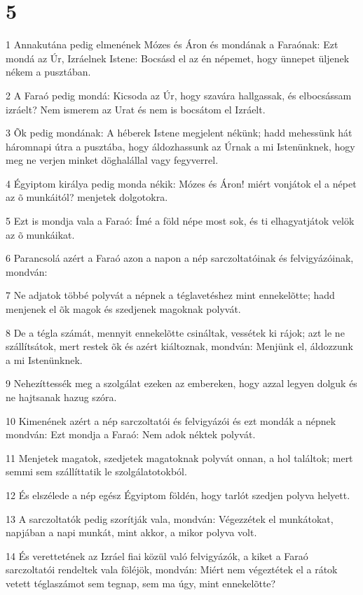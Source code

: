 \chapter{5}

\par 1 Annakutána pedig elmenének Mózes és Áron és mondának a Faraónak: Ezt mondá az Úr, Izráelnek Istene: Bocsásd el az én népemet, hogy ünnepet üljenek nékem a pusztában.
\par 2 A Faraó pedig mondá: Kicsoda az Úr, hogy szavára hallgassak, és elbocsássam izráelt? Nem ismerem az Urat és nem is bocsátom el Izráelt.
\par 3 Õk pedig mondának: A héberek Istene megjelent nékünk; hadd mehessünk hát háromnapi útra a pusztába, hogy áldozhassunk az Úrnak a mi Istenünknek, hogy meg ne verjen minket döghalállal vagy fegyverrel.
\par 4 Égyiptom királya pedig monda nékik: Mózes és Áron! miért vonjátok el a népet az õ munkáitól? menjetek dolgotokra.
\par 5 Ezt is mondja vala a Faraó: Ímé a föld népe most sok, és ti elhagyatjátok velök az õ munkáikat.
\par 6 Parancsolá azért a Faraó azon a napon a nép sarczoltatóinak és felvigyázóinak, mondván:
\par 7 Ne adjatok többé polyvát a népnek a téglavetéshez mint ennekelõtte; hadd menjenek el õk magok és szedjenek magoknak polyvát.
\par 8 De a tégla számát, mennyit ennekelõtte csináltak, vessétek ki rájok; azt le ne szállítsátok, mert restek õk és azért kiáltoznak, mondván: Menjünk el, áldozzunk a mi Istenünknek.
\par 9 Nehezíttessék meg a szolgálat ezeken az embereken, hogy azzal legyen dolguk és ne hajtsanak hazug szóra.
\par 10 Kimenének azért a nép sarczoltatói és felvigyázói és ezt mondák a népnek mondván: Ezt mondja a Faraó: Nem adok néktek polyvát.
\par 11 Menjetek magatok, szedjetek magatoknak polyvát onnan, a hol találtok; mert semmi sem szállíttatik le szolgálatotokból.
\par 12 És elszélede a nép egész Égyiptom földén, hogy tarlót szedjen polyva helyett.
\par 13 A sarczoltatók pedig szorítják vala, mondván: Végezzétek el munkátokat, napjában a napi munkát, mint akkor, a mikor polyva volt.
\par 14 És verettetének az Izráel fiai közül való felvigyázók, a kiket a Faraó sarczoltatói rendeltek vala föléjök, mondván: Miért nem végeztétek el a rátok vetett téglaszámot sem tegnap, sem ma úgy, mint ennekelõtte?
